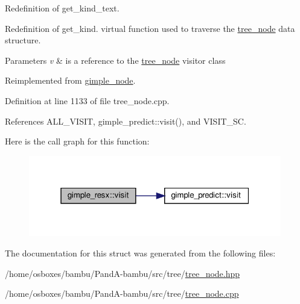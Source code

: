 Redefinition of get\+\_\+kind\+\_\+text. 

Redefinition of get\+\_\+kind. virtual function used to traverse the \hyperlink{classtree__node}{tree\+\_\+node} data structure. 
\begin{DoxyParams}{Parameters}
{\em v} & is a reference to the \hyperlink{classtree__node}{tree\+\_\+node} visitor class \\
\hline
\end{DoxyParams}


Reimplemented from \hyperlink{structgimple__node_a337b029a3aca9c1b96311b6e6668f7f3}{gimple\+\_\+node}.



Definition at line 1133 of file tree\+\_\+node.\+cpp.



References A\+L\+L\+\_\+\+V\+I\+S\+IT, gimple\+\_\+predict\+::visit(), and V\+I\+S\+I\+T\+\_\+\+SC.

Here is the call graph for this function\+:
\nopagebreak
\begin{figure}[H]
\begin{center}
\leavevmode
\includegraphics[width=313pt]{dc/d13/structgimple__resx_aeaec0bead312592457e09d043bc76fea_cgraph}
\end{center}
\end{figure}


The documentation for this struct was generated from the following files\+:\begin{DoxyCompactItemize}
\item 
/home/osboxes/bambu/\+Pand\+A-\/bambu/src/tree/\hyperlink{tree__node_8hpp}{tree\+\_\+node.\+hpp}\item 
/home/osboxes/bambu/\+Pand\+A-\/bambu/src/tree/\hyperlink{tree__node_8cpp}{tree\+\_\+node.\+cpp}\end{DoxyCompactItemize}
